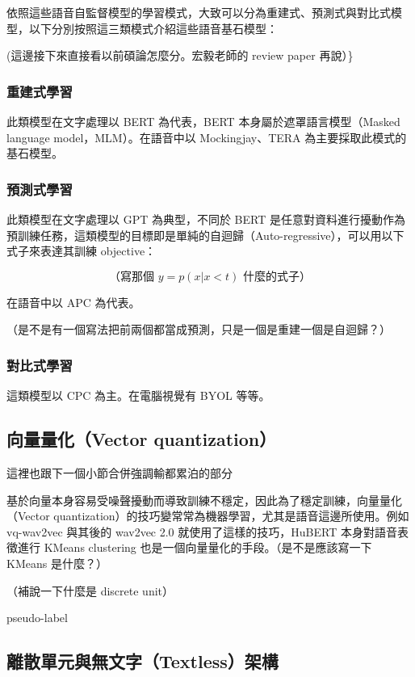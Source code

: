 依照這些語音自監督模型的學習模式，大致可以分為重建式、預測式與對比式模型，以下分別按照這三類模式介紹這些語音基石模型：

(這邊接下來直接看以前碩論怎麼分。宏毅老師的 review paper 再說）\}

\subsubsection{重建式學習}

此類模型在文字處理以 BERT 為代表，BERT 本身屬於遮罩語言模型（Masked language model，MLM）。在語音中以 Mockingjay、TERA 為主要採取此模式的基石模型。

\subsubsection{預測式學習}

此類模型在文字處理以 GPT 為典型，不同於 BERT 是任意對資料進行擾動作為預訓練任務，這類模型的目標即是單純的自迴歸（Auto-regressive），可以用以下式子來表達其訓練 objective：

\[ \mbox{（寫那個 } y = p(x|x<t) \mbox{ 什麼的式子）} \]

在語音中以 APC 為代表。

（是不是有一個寫法把前兩個都當成預測，只是一個是重建一個是自迴歸？）

\subsubsection{對比式學習}

這類模型以 CPC 為主。在電腦視覺有 BYOL 等等。

\subsection{向量量化（Vector quantization）}這裡也跟下一個小節合併強調輸都累泊的部分



基於向量本身容易受噪聲擾動而導致訓練不穩定，因此為了穩定訓練，向量量化（Vector quantization）的技巧變常常為機器學習，尤其是語音這邊所使用。例如 vq-wav2vec 與其後的 wav2vec 2.0 就使用了這樣的技巧，HuBERT 本身對語音表徵進行 KMeans clustering 也是一個向量量化的手段。（是不是應該寫一下 KMeans 是什麼？）

（補說一下什麼是 discrete unit）

pseudo-label 

\subsection{離散單元與無文字（Textless）架構}

